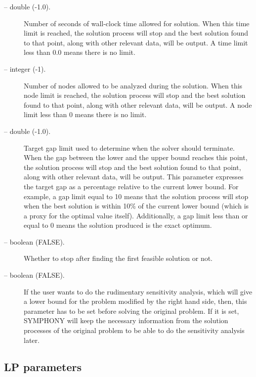 \begin{description}
\item[ -- double (-1.0).] 
Number of seconds of wall-clock time allowed for solution. When this
time limit is reached, the solution process will stop and the best
solution found to that point, along with other relevant data, will be
output. A time limit less than 0.0 means there is no limit.

\item[ -- integer (-1).] 
Number of nodes allowed to be analyzed during the solution. When this
node limit is reached, the solution process will stop and the best
solution found to that point, along with other relevant data, will be
output. A node limit less than 0 means there is no limit. 

\item[ -- double (-1.0).] 
Target gap limit used to determine when the solver should terminate. When the
gap between the lower and the upper bound reaches this point, the solution
process will stop and the best solution found to that point, along with other
relevant data, will be output. This parameter expresses the target gap as a
percentage relative to the current lower bound. For example, a gap limit equal
to 10 means that the solution process will stop when the best solution is
within 10\% of the current lower bound (which is a proxy for the optimal value
itself). Additionally, a gap limit less than or equal to 0 means the solution
produced is the exact optimum.

\item[ -- boolean (FALSE).]
Whether to stop after finding the first feasible solution or not. 

\item[ -- boolean (FALSE).] 
If the user wants to do the rudimentary sensitivity analysis, which will 
give a lower bound for the problem modified by the right hand side, then, 
this parameter has to be set before solving the original problem. If it 
is set, SYMPHONY will keep the necessary information from the solution 
processes of the original problem to be able to do the sensitivity analysis 
later.  

\end{description}

\subsection{LP parameters}

